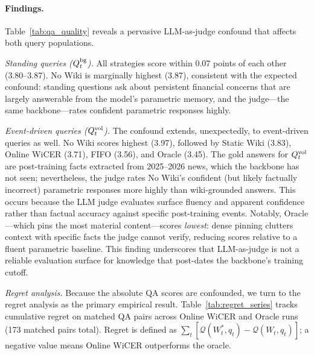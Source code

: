 \documentclass{article}
\begin{document}
\paragraph{Findings.}
Table~\ref{tab:qa_quality} reveals a pervasive LLM-as-judge confound that affects both query populations.

\emph{Standing queries ($Q_t^{\textup{bg}}$).}
All strategies score within 0.07 points of each other (3.80--3.87).
No Wiki is marginally highest (3.87), consistent with the expected confound: standing questions ask about persistent financial concerns that are largely answerable from the model's parametric memory, and the judge---the same backbone---rates confident parametric responses highly.

\emph{Event-driven queries ($Q_t^{\textup{vol}}$).}
The confound extends, unexpectedly, to event-driven queries as well.
No Wiki scores highest (3.97), followed by Static Wiki (3.83), Online WiCER (3.71), FIFO (3.56), and Oracle (3.45).
The gold answers for $Q_t^{\textup{vol}}$ are post-training facts extracted from 2025--2026 news, which the backbone has not seen; nevertheless, the judge rates No Wiki's confident (but likely factually incorrect) parametric responses more highly than wiki-grounded answers.
This occurs because the LLM judge evaluates surface fluency and apparent confidence rather than factual accuracy against specific post-training events.
Notably, Oracle---which pins the most material content---scores \emph{lowest}: dense pinning clutters context with specific facts the judge cannot verify, reducing scores relative to a fluent parametric baseline.
This finding underscores that LLM-as-judge is not a reliable evaluation surface for knowledge that post-dates the backbone's training cutoff.

\emph{Regret analysis.}
Because the absolute QA scores are confounded, we turn to the regret analysis as the primary empirical result.
Table~\ref{tab:regret_series} tracks cumulative regret on matched QA pairs across Online WiCER and Oracle runs (173 matched pairs total).
Regret is defined as $\sum_t [\mathcal{Q}(W^*_t, q_t) - \mathcal{Q}(W_t, q_t)]$; a negative value means Online WiCER outperforms the oracle.
\end{document}
